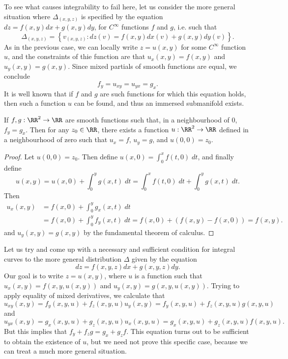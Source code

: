 To see what causes integrability to fail here, let us consider the more general situation where $\Delta_{(x,y,z)}$ is specified by the equation $dz = f(x,y) dx + g(x,y) dy$, for $C^\infty$ functions $f$ and $g$, i.e. such that
%
\[ \Delta_{(x,y,z)} = \left\{ v_{(x,y,z)}: dz(v) = f(x,y) dx(v) + g(x,y) dy(v) \right\}. \]
%
As in the previous case, we can locally write $z = u(x,y)$ for some $C^\infty$ function $u$, and the constraints of thie function are that $u_x(x,y) = f(x,y)$ and $u_y(x,y) = g(x,y)$. Since mixed partials of smooth functions are equal, we conclude
%
\[ f_y = u_{xy} = u_{yx} = g_x. \]
%
It is well known that if $f$ and $g$ are such functions for which this equation holds, then such a function $u$ can be found, and thus an immersed submanifold exists.

\begin{lemma}
    If $f,g : \RR^2 \to \RR$ are smooth functions such that, in a neighbourhood of 0, $f_y = g_x$. Then for any $z_0 \in \RR$, there exists a function $u: \RR^2 \to \RR$ defined in a neighbourhood of zero such that $u_x = f$, $u_y = g$, and $u(0,0) = z_0$.
\end{lemma}
\begin{proof}
    Let $u(0,0) = z_0$. Then define $u(x,0) = \int_0^x f(t,0)\; dt$, and finally define
    \[ u(x,y) = u(x,0) + \int_0^y g(x,t)\; dt = \int_0^x f(t,0)\; dt + \int_0^y g(x,t)\; dt. \]
    Then
    \begin{align*}
        u_x(x,y) &= f(x,0) + \int_0^y g_x(x,t)\; dt\\
        &= f(x,0) + \int_0^y f_y(x,t)\; dt = f(x,0) + (f(x,y) - f(x,0)) = f(x,y).
    \end{align*}
    and $u_y(x,y) = g(x,y)$ by the fundamental theorem of calculus.
\end{proof}

Let us try and come up with a necessary and sufficient condition for integral curves to the more general distribution $\Delta$ given by the equation
%
\[ dz = f(x,y,z) dx + g(x,y,z) dy. \]
%
Our goal is to write $z = u(x,y)$, where $u$ is a function such that $u_x(x,y) = f(x,y,u(x,y))$ and $u_y(x,y) = g(x,y,u(x,y))$. Trying to apply equality of mixed derivatives, we calculate that
%
\[ u_{xy}(x,y) = f_y(x,y,u) + f_z(x,y,u) u_y(x,y) = f_y(x,y,u) + f_z(x,y,u) g(x,y,u) \]
%
and
%
\[ u_{yx}(x,y) = g_x(x,y,u) + g_z(x,y,u) u_x(x,y,u) = g_x(x,y,u) + g_z(x,y,u) f(x,y,u). \]
%
But this implies that $f_y + f_z g = g_x + g_z f$. This equation turns out to be sufficient to obtain the existence of $u$, but we need not prove this specific case, because we can treat a much more general situation.

